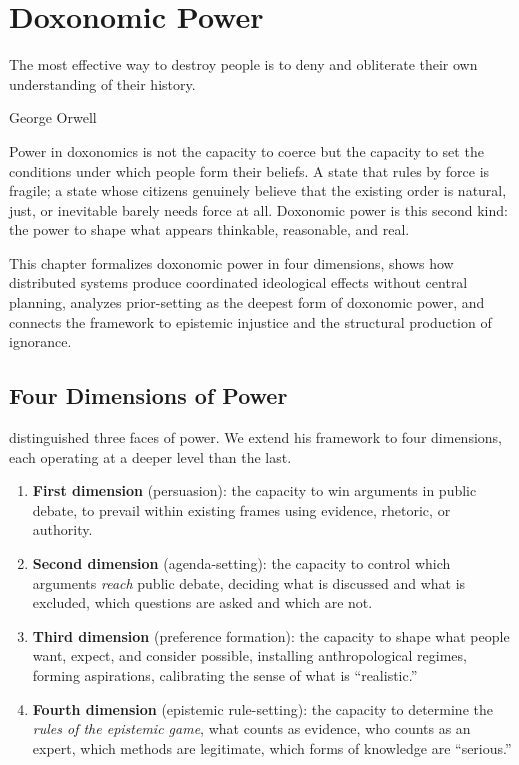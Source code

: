 \chapter{Doxonomic Power}
\label{ch:doxonomic-power}

\epigraph{The most effective way to destroy people is to deny and obliterate their own understanding of their history.}{George Orwell}

\noindent
Power in doxonomics is not the capacity to coerce but the capacity to set the conditions under which people form their beliefs.
A state that rules by force is fragile; a state whose citizens genuinely believe that the existing order is natural, just, or inevitable barely needs force at all.
Doxonomic power is this second kind: the power to shape what appears thinkable, reasonable, and real.

This chapter formalizes doxonomic power in four dimensions, shows how distributed systems produce coordinated ideological effects without central planning, analyzes prior-setting as the deepest form of doxonomic power, and connects the framework to epistemic injustice and the structural production of ignorance.


\section{Four Dimensions of Power}
\label{sec:ch9-lukes}

\textcite{lukes2005} distinguished three faces of power.
We extend his framework to four dimensions, each operating at a deeper level than the last.

\begin{definition}
\label{def:doxonomic-power}
\begin{enumerate}[nosep]
  \item \textbf{First dimension} (persuasion): the capacity to win arguments in public debate, to prevail within existing frames using evidence, rhetoric, or authority.
  \item \textbf{Second dimension} (agenda-setting): the capacity to control which arguments \emph{reach} public debate, deciding what is discussed and what is excluded, which questions are asked and which are not.
  \item \textbf{Third dimension} (preference formation): the capacity to shape what people want, expect, and consider possible, installing anthropological regimes, forming aspirations, calibrating the sense of what is ``realistic.''
  \item \textbf{Fourth dimension} (epistemic rule-setting): the capacity to determine the \emph{rules of the epistemic game}, what counts as evidence, who counts as an expert, which methods are legitimate, which forms of knowledge are ``serious.''
\end{enumerate}
\end{definition}

